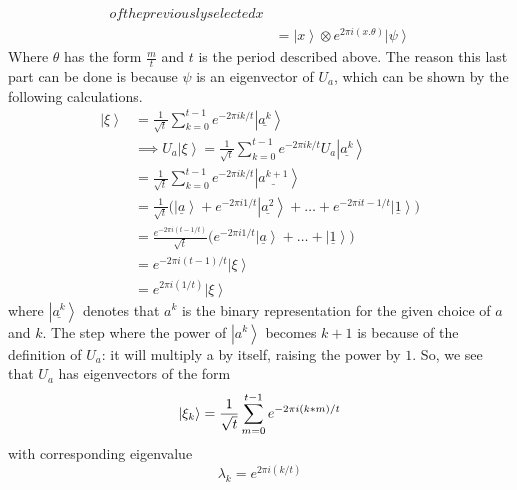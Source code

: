 \documentclass{exam} %
\theoremstyle{plain}
\theoremstyle{definition}
\theoremstyle{remark}
\numberwithin{equation}{section}  %
\newcommand{\ket}[1]{ \left| #1 \right> }
\begin{document}
\begin{enumerate}
\begin{enumerate}
\begin{align*}
{            of the previously selected } x\\
            &= \ket{x} \otimes e^{2\pi i(x.\theta)}\ket{\psi}
          \end{align*}
          Where $\theta$ has the form $\frac{m}{t}$ and $t$ is the period
          described above. The reason this last part can be done is because
          $\psi$ is an eigenvector of $U_a$, which can be shown by the following
          calculations.
          \begin{align*}
            \ket{\xi} 
            &= \frac{1}{\sqrt{t}}\sum_{k=0}^{t-1} 
               e^{-2\pi i k/t}\ket{\underline{a^k}}\\
            &\implies 
            U_a\ket{\xi} = \frac{1}{\sqrt{t}}\sum_{k=0}^{t-1} 
            e^{-2\pi i k/t} U_a \ket{\underline{a^k}}\\
            &= \frac{1}{\sqrt{t}}\sum_{k=0}^{t-1} 
            e^{-2\pi i k/t}\ket{\underline{a^{k+1}}}\\
            &= \frac{1}{\sqrt{t}}\big(\ket{\underline{a}}+e^{-2\pi i 
            1/t}\ket{\underline{a^2}}+
            \hdots+e^{-2\pi i {t-1}/t}\ket{\underline{1}} \big)\\
            &= \frac{e^{-2\pi i({t-1}/t)}}{\sqrt{t}}\big(e^{-2\pi i 
            1/t}\ket{\underline{a}}+\hdots+\ket{\underline{1}} \big)\\
            &= e^{-2\pi i (t-1)/t}\ket{\xi}\\
            &= e^{2\pi i (1/t)}\ket{\xi}
          \end{align*}
          where $\ket{\underline{a^k}}$ denotes that $a^k$ is the binary 
          representation for the given choice of $a$ and $k$. The step where
          the power of $\ket{a^k}$ becomes $k+1$ is because of the definition
          of $U_a$: it will multiply a by itself, raising the power by $1$. So,
          we see that $U_a$ has eigenvectors of the form 
          \[
            \ket{\xi_k} = \frac{1}{\sqrt{t}}\sum_{m=0}^{t-1} e^{-2\pi i(k*m)/t}\\
          \]
          with corresponding eigenvalue
          \[
            \lambda_k = e^{2\pi i (k/t)}
          \]


\end{enumerate}
\end{enumerate}
\end{document}
